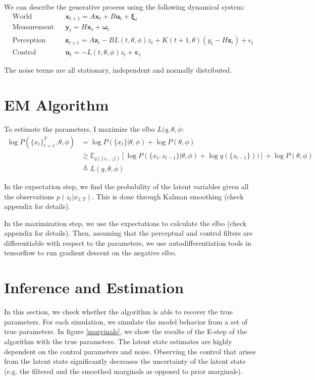 \documentclass[11pt, reqno]{article}
\numberwithin{equation}{section}
\begin{document}
\noindent We can describe the generative process using the following dynamical system:
\begin{align*}
&\text{World} &&\bm{x}_{t+1} = A\bm{x}_t + B\bm{u}_{t} + \bm{\xi}_t &\\
&\text{Measurement} &&\bm{y}_{t} = H\bm{x}_t + \bm{\omega}_t &\\
&\text{Perception} &&\bm{z}_{t+1} = A\bm{z}_{t} - BL(t,\theta, \phi)z_{t}+ K(t+1,\theta) (y_t - H\bm{z}_{t})+ \epsilon_t &\\
&\text{Control} &&\bm{u}_{t} = - L(t,\theta, \phi)z_{t} + \bm{\varepsilon}_t &
\end{align*}

\noindent The noise terms are all stationary,  independent and normally distributed. 

\section{EM Algorithm}

To estimate the parameters,  I maximize the elbo $ L(q,\theta,\phi$: 
\begin{align*}
\log P(\{x_t\}_{t=1}^T, \theta, \phi) &= \log P(\{x_t\} | \theta, \phi) + \log P(\theta, \phi)   \\
&\geq \mathbb{E}_{q(\{z_{t-1}\})} \left[ \log P(\{x_{t}, z_{t-1}\}|\theta, \phi)  + \log q(\{z_{t-1}\})) \right]+ \log P(\theta, \phi) \\
& \triangleq L(q,\theta,\phi)
\end{align*}

In the expectation step,  we find the probability of the latent variables given all the observations  $p(z_t | x_{1:T})$. This is done through Kalman smoothing (check appendix for details).  

In the maximization step,  we use the expectations to calculate the elbo (check appendix for details). Then, assuming that the perceptual and control filters are differentiable with respect to the parameters, we use autodifferentiation tools in tensorflow to run gradient descent on the negative elbo.

\section{Inference and Estimation}
In this section,  we check whether the algorithm is able to recover the true parameters.  For each simulation, we simulate the model behavior from a set of true parameters.  In figure \ref{marginals},  we show the results of the E-step of the algorithm with the true parameters.  The latent state estimates are highly dependent on the control parameters and noise.  Observing the control that arises from the latent state significantly decreases the uncertainty of the latent state (e.g. the filtered and the smoothed marginals as opposed to prior marginals). 
\end{document}
